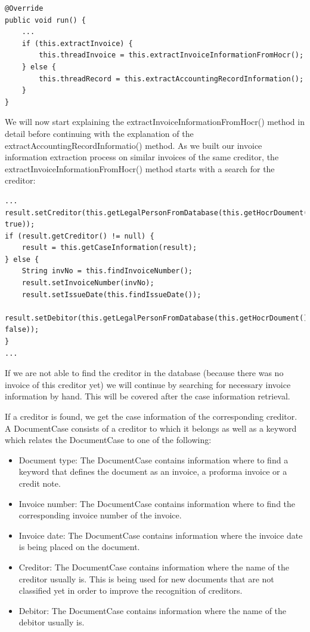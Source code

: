 \begin{lstlisting}[caption={Beginning of the information extraction}]
@Override
public void run() {
    ...
    if (this.extractInvoice) {
        this.threadInvoice = this.extractInvoiceInformationFromHocr();
    } else {
        this.threadRecord = this.extractAccountingRecordInformation();
    }
}
\end{lstlisting}

We will now start explaining the extractInvoiceInformationFromHocr() method in detail before continuing with the explanation of the extractAccountingRecordInformatio() method.
As we built our invoice information extraction process on similar invoices of the same creditor, the extractInvoiceInformationFromHocr() method starts with a search for the creditor:

\begin{lstlisting}[caption={Call for creditor in the database}]
...
result.setCreditor(this.getLegalPersonFromDatabase(this.getHocrDoument(), true));
if (result.getCreditor() != null) {
    result = this.getCaseInformation(result);
} else {
    String invNo = this.findInvoiceNumber();
    result.setInvoiceNumber(invNo);
    result.setIssueDate(this.findIssueDate());
    result.setDebitor(this.getLegalPersonFromDatabase(this.getHocrDoument(), false));
}
...
\end{lstlisting}

If we are not able to find the creditor in the database (because there was no invoice of this creditor yet) we will continue by searching for necessary invoice information by hand. This will be covered after the case information retrieval.

If a creditor is found, we get the case information of the corresponding creditor. A DocumentCase consists of a creditor to which it belongs as well as a keyword which relates the DocumentCase to one of the following:
\begin{itemize}
	\item Document type: The DocumentCase contains information where to find a keyword that defines the document as an invoice, a proforma invoice or a credit note.
	\item Invoice number: The DocumentCase contains information where to find the corresponding invoice number of the invoice.
	\item Invoice date: The DocumentCase contains information where the invoice date is being placed on the document.
	\item Creditor: The DocumentCase contains information where the name of the creditor usually is. This is being used for new documents that are not classified yet in order to improve the recognition of creditors.
	\item Debitor: The DocumentCase contains information where the name of the debitor usually is.
\end{itemize}

